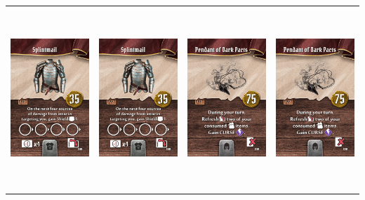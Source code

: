 \documentclass{minimal}
\begin{document}
{\begin{longtable}{llll}
\includegraphics[width=44mm,height=68mm]{./43-49/gh-044-splintmail.png} &
\includegraphics[width=44mm,height=68mm]{./43-49/gh-044-splintmail.png} &
\includegraphics[width=44mm,height=68mm]{./43-49/gh-045-pendant-of-dark-pacts.png} &
\includegraphics[width=44mm,height=68mm]{./43-49/gh-045-pendant-of-dark-pacts.png}\\ 

\end{longtable}}
\end{document}
